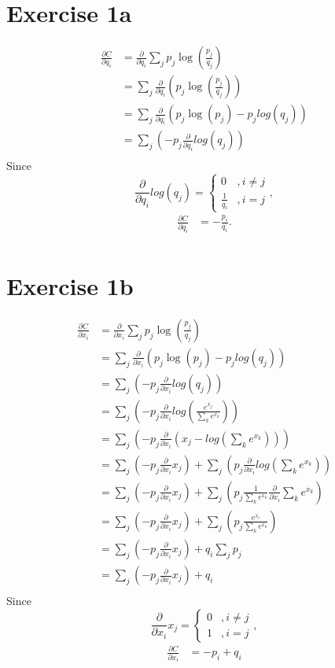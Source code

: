 \documentclass[a4paper]{article}
\begin{document}
\section*{Exercise 1a}
\begin{align*}
\frac{\partial C}{\partial q_i}
&=\frac{\partial}{\partial q_i}\sum_{j}p_j\log(\frac{p_j}{q_j})\\
&=\sum_{j}\frac{\partial}{\partial q_i}\left(p_j\log(\frac{p_j}{q_j})\right)\\
&=\sum_{j}\frac{\partial}{\partial q_i}\left(p_j\log(p_j)-p_jlog(q_j)\right)\\
&=\sum_{j}\left(-p_j\frac{\partial}{\partial q_i}log(q_j)\right)\\
\end{align*}
Since \[ \frac{\partial}{\partial q_i}log(q_j)=\begin{cases}
   0 &, i\neq j \\
   \frac{1}{q_i} &, i=j\end{cases},  \]
\begin{align*}
\frac{\partial C}{\partial q_i}
&=-\frac{p_i}{q_i}.\\
\end{align*}
\section*{Exercise 1b}
\begin{align*}
\frac{\partial C}{\partial x_i}
&=\frac{\partial}{\partial x_i}\sum_{j}p_j\log(\frac{p_j}{q_j})\\
&=\sum_{j}\frac{\partial}{\partial x_i}\left(p_j\log(p_j)-p_jlog(q_j)\right)\\
&=\sum_{j}\left(-p_j\frac{\partial}{\partial x_i}log(q_j)\right)\\
&=\sum_{j}\left(-p_j\frac{\partial}{\partial x_i}log(\frac{e^{x_j}}{\sum_{k}e^{x_k}})\right)\\
&=\sum_{j}\left(-p_j\frac{\partial}{\partial x_i}(x_j-log(\sum_{k}e^{x_k}))\right)\\
&=\sum_{j}\left(-p_j\frac{\partial}{\partial x_i}x_j\right)+\sum_{j}\left(p_j\frac{\partial}{\partial x_i}log(\sum_{k}e^{x_k})\right)\\
&=\sum_{j}\left(-p_j\frac{\partial}{\partial x_i}x_j\right)+\sum_{j}\left(p_j\frac{1}{\sum_{k}e^{x_k}}\frac{\partial}{\partial x_i}\sum_{k}e^{x_k}\right)\\
&=\sum_{j}\left(-p_j\frac{\partial}{\partial x_i}x_j\right)+\sum_{j}\left(p_j\frac{e^{x_i}}{\sum_{k}e^{x_k}}\right)\\
&=\sum_{j}\left(-p_j\frac{\partial}{\partial x_i}x_j\right)+q_i\sum_{j}p_j\\
&=\sum_{j}\left(-p_j\frac{\partial}{\partial x_i}x_j\right)+q_i\\
\end{align*}
Since \[ \frac{\partial}{\partial x_i}x_j=\begin{cases}
   0 &, i\neq j \\
   1 &, i=j\end{cases},  \]
\begin{align*}
\frac{\partial C}{\partial x_i}
&=-p_i+q_i\\
\end{align*}
\end{document}
